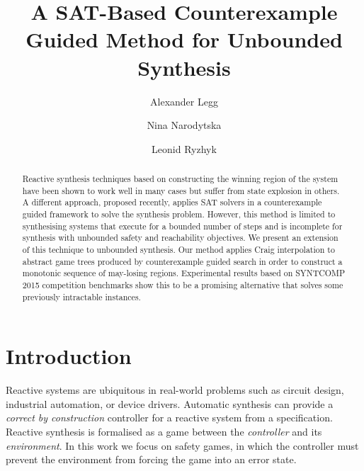 \documentclass{llncs}
\begin{document}
\title{A SAT-Based Counterexample Guided Method for Unbounded Synthesis}

\author{Alexander Legg 
    \and Nina Narodytska
    \and Leonid Ryzhyk}


\maketitle

\sloppy

\begin{abstract}

    Reactive synthesis techniques based on constructing the winning region of
    the system have been shown to work well in many cases but suffer from state
    explosion in others.  A different approach, proposed recently, applies SAT
    solvers in a counterexample guided framework to solve the synthesis
    problem.  However, this method is limited to synthesising systems that
    execute for a bounded number of steps and is incomplete for synthesis with
    unbounded safety and reachability objectives.  We present an extension of
    this technique to unbounded synthesis.  Our method applies Craig
    interpolation to abstract game trees produced by counterexample guided
    search in order to construct a monotonic sequence of may-losing regions.
    Experimental results based on SYNTCOMP 2015 competition benchmarks show
    this to be a promising alternative that solves some previously intractable
    instances.

\end{abstract}

\section{Introduction}

Reactive systems are ubiquitous in real-world problems such as circuit design,
industrial automation, or device drivers. Automatic synthesis can provide a
\emph{correct by construction} controller for a reactive system from a
specification.  Reactive synthesis is formalised as a game between the \emph{controller} and
its \emph{environment}. In this work we focus on safety games, in which the
controller must prevent the environment from forcing the game into an error
state.
\end{document}
